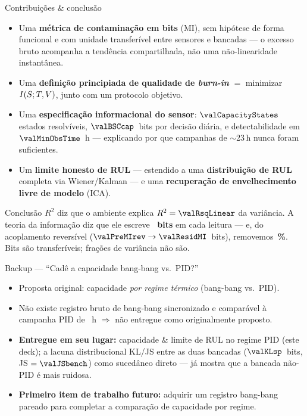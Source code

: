 \documentclass[aspectratio=169,11pt]{beamer}
\begin{document}
\begin{frame}[shrink=6]{Contribuições \& conclusão}
  \small
  \begin{itemize}
    \setlength{\itemsep}{1pt}
    \item Uma \textbf{métrica de contaminação em bits} (MI), sem hipótese de
          forma funcional e com unidade transferível entre sensores e bancadas
          --- o excesso bruto acompanha a tendência compartilhada, não uma
          não-linearidade instantânea.
    \item Uma \textbf{definição principiada de qualidade de \emph{burn-in}} $=$
          minimizar $I\!\left(S ; T,V\right)$, junto com um protocolo
          objetivo.
    \item Uma \textbf{especificação informacional do sensor}: $\valCapacityStates$
          estados resolvíveis, $\valBSCcap$~bits por decisão diária, e
          detectabilidade em $\valMinObsTime$~h --- explicando por que
          campanhas de $\sim$23\,h nunca foram suficientes.
    \item Um \textbf{limite honesto de RUL} --- estendido a uma
          \textbf{distribuição de RUL} completa via Wiener/Kalman --- e uma
          \textbf{recuperação de envelhecimento livre de modelo} (ICA).
  \end{itemize}
  \vfill
  \begin{alertblock}{Conclusão}
    $R^2$ diz que o ambiente explica $R^2=\valRsqLinear$ da variância. A
    teoria da informação diz que ele escreve \textbf{\valMIstv~bits} em
    cada leitura --- e, do acoplamento reversível
    ($\valPreMIrev\to\valResidMI$~bits), removemos
    \textbf{\valMIreductionPct\,\%}. Bits são transferíveis; frações de
    variância não são.
  \end{alertblock}
\end{frame}

\appendix
\begin{frame}{Backup --- ``Cadê a capacidade bang-bang vs.\ PID?''}
  \begin{itemize}
    \item Proposta original: capacidade \emph{por regime térmico}
          (bang-bang vs.\ PID).
    \item Não existe registro bruto de bang-bang sincronizado e comparável
          à campanha PID de \valDurationHours~h $\Rightarrow$ não entregue
          como originalmente proposto.
    \item \textbf{Entregue em seu lugar:} capacidade \& limite de RUL no
          regime PID (este deck); a lacuna distribucional KL/JS entre as
          duas bancadas ($\valKLsp$~bits, JS $=\valJSbench$) como
          sucedâneo direto --- já mostra que a bancada não-PID é mais ruidosa.
    \item \textbf{Primeiro item de trabalho futuro:} adquirir um registro
          bang-bang pareado para completar a comparação de capacidade por regime.
  \end{itemize}
\end{frame}
\end{document}

